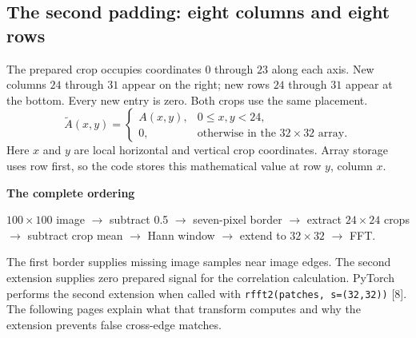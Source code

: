 \documentclass[11pt,letterpaper]{article}
\begin{document}
\subsection*{The second padding: eight columns and eight rows}
The prepared crop occupies coordinates $0$ through $23$ along each axis. New columns $24$ through $31$ appear on the right; new rows $24$ through $31$ appear at the bottom. Every new entry is zero. Both crops use the same placement.
\[
\widetilde A(x,y)=\begin{cases}A(x,y),&0\leq x,y<24,\\0,&\text{otherwise in the }32\times32\text{ array}.\end{cases}
\]
Here $x$ and $y$ are local horizontal and vertical crop coordinates. Array storage uses row first, so the code stores this mathematical value at row $y$, column $x$.

\begin{center}
\end{center}

\textbf{The complete ordering}\par
$100\times100$ image $\longrightarrow$ subtract 0.5 $\longrightarrow$ seven-pixel border $\longrightarrow$ extract $24\times24$ crops $\longrightarrow$ subtract crop mean $\longrightarrow$ Hann window $\longrightarrow$ extend to $32\times32$ $\longrightarrow$ FFT.

The first border supplies missing image samples near image edges. The second extension supplies zero prepared signal for the correlation calculation. PyTorch performs the second extension when called with \texttt{rfft2(patches, s=(32,32))} [8]. The following pages explain what that transform computes and why the extension prevents false cross-edge matches.
\end{document}
